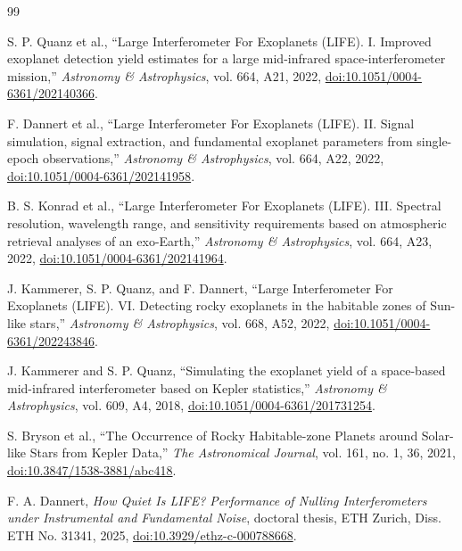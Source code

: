 \documentclass[12pt,a4paper]{article}
\numberwithin{equation}{section}
\numberwithin{figure}{section}
\numberwithin{table}{section}
\begin{document}
\clearpage
\thispagestyle{chapteropening}
\small
{}
{}
\begin{thebibliography}{99}

S. P. Quanz et al.,
``Large Interferometer For Exoplanets (LIFE). I. Improved exoplanet detection yield estimates for a large mid-infrared space-interferometer mission,''
\textit{Astronomy \& Astrophysics}, vol. 664, A21, 2022,
\href{https://doi.org/10.1051/0004-6361/202140366}{doi:10.1051/0004-6361/202140366}.

F. Dannert et al.,
``Large Interferometer For Exoplanets (LIFE). II. Signal simulation, signal extraction, and fundamental exoplanet parameters from single-epoch observations,''
\textit{Astronomy \& Astrophysics}, vol. 664, A22, 2022,
\href{https://doi.org/10.1051/0004-6361/202141958}{doi:10.1051/0004-6361/202141958}.

B. S. Konrad et al.,
``Large Interferometer For Exoplanets (LIFE). III. Spectral resolution, wavelength range, and sensitivity requirements based on atmospheric retrieval analyses of an exo-Earth,''
\textit{Astronomy \& Astrophysics}, vol. 664, A23, 2022,
\href{https://doi.org/10.1051/0004-6361/202141964}{doi:10.1051/0004-6361/202141964}.

J. Kammerer, S. P. Quanz, and F. Dannert,
``Large Interferometer For Exoplanets (LIFE). VI. Detecting rocky exoplanets in the habitable zones of Sun-like stars,''
\textit{Astronomy \& Astrophysics}, vol. 668, A52, 2022,
\href{https://doi.org/10.1051/0004-6361/202243846}{doi:10.1051/0004-6361/202243846}.

J. Kammerer and S. P. Quanz,
``Simulating the exoplanet yield of a space-based mid-infrared interferometer based on Kepler statistics,''
\textit{Astronomy \& Astrophysics}, vol. 609, A4, 2018,
\href{https://doi.org/10.1051/0004-6361/201731254}{doi:10.1051/0004-6361/201731254}.

S. Bryson et al.,
``The Occurrence of Rocky Habitable-zone Planets around Solar-like Stars from Kepler Data,''
\textit{The Astronomical Journal}, vol. 161, no. 1, 36, 2021,
\href{https://doi.org/10.3847/1538-3881/abc418}{doi:10.3847/1538-3881/abc418}.

F. A. Dannert,
\textit{How Quiet Is LIFE? Performance of Nulling Interferometers under Instrumental and Fundamental Noise},
doctoral thesis, ETH Zurich, Diss. ETH No. 31341, 2025,
\href{https://doi.org/10.3929/ethz-c-000788668}{doi:10.3929/ethz-c-000788668}.


\end{thebibliography}
\end{document}
